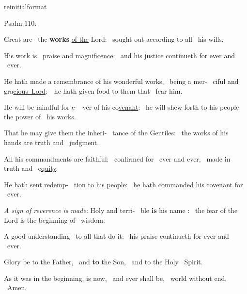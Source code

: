 \documentclass[12pt]{article} %
\newcommand{\myaboveinitial}[1]{%
    \expandafter\renewcommand\csname greinitialformat\endcsname[1]{%
        \fontsize{43}{43}\selectfont ##1
    }
    \gresetfirstlineaboveinitial{\textcolor{benred8}{\raisebox{6.0mm}{\small \textsc{\textbf{#1}}}}}{}
}
\def\noinitial{%
\gresetfirstlineaboveinitial{\textcolor{benred8}{\small \textsc{\textbf{}}}}{\textcolor{benred8}{\small \textsc{\textbf{}}}}
\setspaceafterinitial{0pt plus 0em minus 0em}%
\setspacebeforeinitial{0pt plus 0em minus 0em}%
\relax %
}
\newenvironment{psalmtext}{\leftskip 0.25in}{\vspace{1 mm}}
\def\pipe{\textcolor{benred8}{\textdoublepipe}}
\let\oldgresixstar\gresixstar
\renewcommand{\gresixstar}{\textcolor{benred8}{\oldgresixstar}}
\let\oldgredagger\gredagger
\renewcommand{\gredagger}{\textcolor{benred8}{\oldgredagger}}
\let\oldAbar\Abar
\renewcommand{\Abar}{\textcolor{benred8}{\oldAbar .}}
\begin{document}
\begin{pages}
\begin{Rightside}
\myaboveinitial{2 \Abar\ IV g}

\pend\pstart

{
\centering
\textcolor{benred8}{Psalm 110.}

}

\pend\pstart

{\noinitial
{}

}

\pend\pstart

\begin{psalmtext}

Great are \pipe\ the \textbf{works} \uline{of the} Lord: \gresixstar\ sought out according to all \pipe\ his wills.

His work is \pipe\ praise and magni\uline{ficence}: \gresixstar\ and his justice continueth for ever and \pipe\ ever.

He hath made a remembrance of his wonderful works, \gredagger\ being a mer- \pipe\ ciful and gra\uline{cious~Lord}:~\gresixstar\ he hath given food to them that \pipe\ fear him.

He will be mindful for e- \pipe\ ver of his co\uline{venant}: \gresixstar\ he will shew forth to his people the power of \pipe\ his works.

That he may give them the inheri- \pipe\ tance of the Gentiles: \gresixstar\ the works of his hands are truth and \pipe\ judgment.

All his commandments are faithful: \gredagger\ confirmed for \pipe\ ever and ever, \gresixstar\ made in truth and \pipe\ e\uline{quity}.

He hath sent redemp- \pipe\ tion to his people: \gresixstar\ he hath commanded his covenant for \pipe\ ever.

\textcolor{benred8}{\emph{A sign of reverence is made:}} Holy and terri- \pipe\ ble \textbf{is} his name : \gresixstar\ the fear of the Lord is the beginning of \pipe\ wisdom.

A good understanding \pipe\ to all that do it: \gresixstar\ his praise continueth for ever and \pipe\ ever.

Glory be to the Father, \pipe\ and \textbf{to} the Son, \gresixstar\ and to the Holy \pipe\ Spirit.

As it was in the beginning, is now, \pipe\ and ever shall be, \gresixstar\ world without end. \pipe\ Amen.


\end{psalmtext}
\end{Rightside}
\end{pages}
\end{document}
